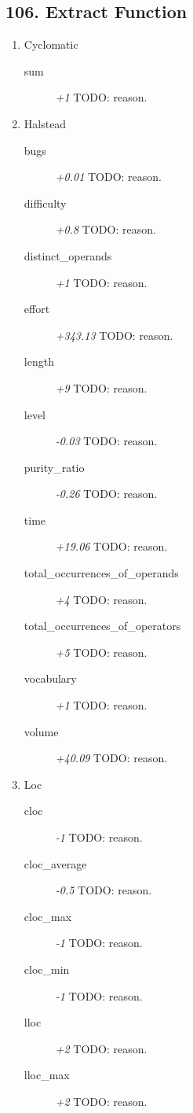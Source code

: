 \subsection{106. Extract Function}

\begin{enumerate}
  \item Cyclomatic
        \begin{description}
          \item [sum] \textit{+1} TODO: reason.
        \end{description}
  \item Halstead
        \begin{description}
          \item [bugs] \textit{+0.01} TODO: reason.
          \item [difficulty] \textit{+0.8} TODO: reason.
          \item [distinct\_operands] \textit{+1} TODO: reason.
          \item [effort] \textit{+343.13} TODO: reason.
          \item [length] \textit{+9} TODO: reason.
          \item [level] \textit{-0.03} TODO: reason.
          \item [purity\_ratio] \textit{-0.26} TODO: reason.
          \item [time] \textit{+19.06} TODO: reason.
          \item [total\_occurrences\_of\_operands] \textit{+4} TODO: reason.
          \item [total\_occurrences\_of\_operators] \textit{+5} TODO: reason.
          \item [vocabulary] \textit{+1} TODO: reason.
          \item [volume] \textit{+40.09} TODO: reason.
        \end{description}
  \item Loc
        \begin{description}
          \item [cloc] \textit{-1} TODO: reason.
          \item [cloc\_average] \textit{-0.5} TODO: reason.
          \item [cloc\_max] \textit{-1} TODO: reason.
          \item [cloc\_min] \textit{-1} TODO: reason.
          \item [lloc] \textit{+2} TODO: reason.
          \item [lloc\_max] \textit{+2} TODO: reason.

\end{description}
\end{enumerate}
